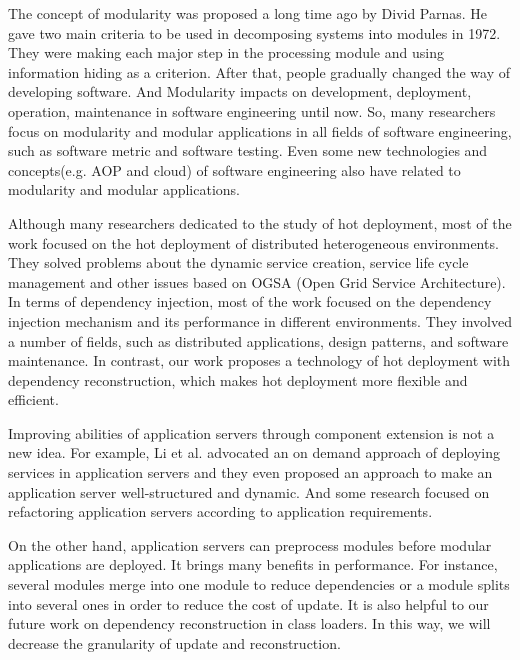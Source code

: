 \documentclass[conference]{IEEEtran}
\begin{document}
The concept of modularity was proposed a long time ago by Divid Parnas\cite{Divid_specification}.
He gave two main criteria\cite{Divid_criteria} to be used in decomposing systems into modules in 1972.
They were making each major step in the processing module and using information hiding as a criterion.
After that, people gradually changed the way of developing software.
And Modularity impacts on development, deployment, operation, maintenance in software engineering until now.
So, many researchers focus on modularity and modular applications in all fields of software engineering, such as software metric\cite{module_metric} and software testing\cite{module_test}.
Even some new technologies and concepts(e.g. AOP\cite{module_aop} and cloud\cite{module_cloud}) of software engineering also have related to modularity and modular applications.

Although many researchers dedicated to the study of hot deployment, most of the work focused on the hot deployment of distributed heterogeneous environments\cite{related_hot_1, related_hot_2, related_hot_3, related_hot_4}.
They solved problems about the dynamic service creation, service life cycle management and other issues based on OGSA (Open Grid Service Architecture).
In terms of dependency injection, most of the work focused on the dependency injection mechanism and its performance in different environments\cite{related_DI_1, related_DI_2, related_DI_3}.
They involved a number of fields, such as distributed applications, design patterns, and software maintenance.
In contrast, our work proposes a technology of hot deployment with dependency reconstruction, which makes hot deployment more flexible and efficient.

Improving abilities of application servers through component extension is not a new idea.
For example, Li et al. advocated an on demand approach of deploying services in application servers\cite{related_AS_1} and they even proposed an approach to make an application server well-structured and dynamic\cite{related_AS_2}.
And some research focused on refactoring application servers according to application requirements\cite{related_AS_3}.
	
On the other hand, application servers can preprocess modules before modular applications are deployed.
It brings many benefits in performance. For instance, several modules merge into one module to reduce dependencies\cite{related_merge} or a module splits into several ones in order to reduce the cost of update\cite{related_split}.
It is also helpful to our future work on dependency reconstruction in class loaders.
In this way, we will decrease the granularity of update and reconstruction.
\end{document}
